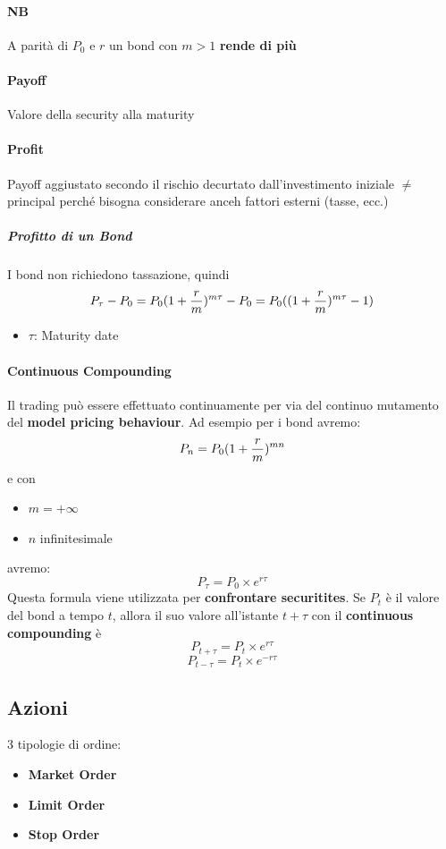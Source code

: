 \documentclass[12pt]{article}
\begin{document}
\paragraph{NB} A parità di $P_0$ e $r$ un bond con $m>1$ \textbf{rende di più}
\paragraph{Payoff} Valore della security alla maturity
\paragraph{Profit} Payoff aggiustato secondo il rischio decurtato dall'investimento iniziale $\neq$ principal perché bisogna considerare anceh fattori esterni (tasse, ecc.)
\subparagraph{Profitto di un Bond} I bond non richiedono tassazione, quindi
$$P_\tau - P_0 = P_0(1+{r\over m})^{m\tau}-P_0=P_0((1+{r \over m})^{m\tau}-1)$$
\begin{itemize}[label=]
    \item $\tau$: Maturity date
\end{itemize}
\paragraph{Continuous Compounding} Il trading può essere effettuato continuamente per via del continuo mutamento del \textbf{model pricing behaviour}. Ad esempio per i bond avremo:
$$P_n=P_0(1+{r \over m})^{mn}$$
e con
\begin{itemize}[label=]
    \item $m = + \infty$
    \item $n$ infinitesimale
\end{itemize}
avremo:
$$P_\tau = P_0\times e^{r\tau}$$
Questa formula viene utilizzata per \textbf{confrontare securitites}. Se $P_t$ è il valore del bond a tempo $t$, allora il suo valore all'istante $t+\tau$ con il \textbf{continuous compounding} è
$$P_{t+\tau} = P_t\times e^{r\tau}$$
$$P_{t-\tau} = P_t\times e^{-r\tau}$$
\subsection{Azioni}
3 tipologie di ordine:
\begin{itemize}
    \item \textbf{Market Order}
    \item \textbf{Limit Order}
    \item \textbf{Stop Order}
\end{itemize}
\end{document}
